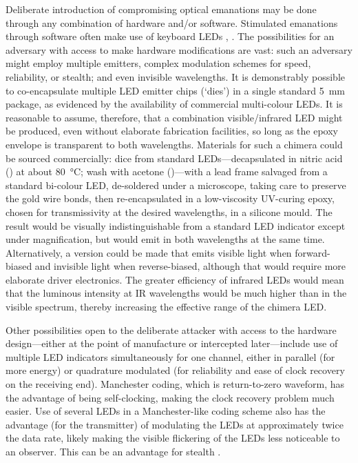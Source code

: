 \documentclass[a4paper,twoside,11pt,openany]{book}
\begin{document}
Deliberate introduction of compromising optical emanations may be done through
any combination of hardware and/or software. Stimulated emanations through
software often make use of keyboard LEDs \cite[Appendix A]{Loughry2002a},
\cite{Zhou2018c}. The possibilities for an adversary
with access to make hardware modifications are vast: such an adversary might
employ multiple emitters, complex modulation schemes for speed, reliability, or
stealth; and even invisible wavelengths. It is demonstrably possible to
co-encapsulate multiple LED emitter chips (`dies') in a single standard
\SI{5}{\milli\metre} package, as evidenced by the availability of commercial
multi-colour LEDs. It is reasonable to assume, therefore, that a combination
visible/infrared LED might be produced, even without elaborate fabrication
facilities, so long as the epoxy envelope is transparent to both wavelengths.
Materials for such a chimera could be sourced commercially: dice from standard
LEDs---decapsulated in nitric acid () at about \SI{80}{\celsius}; wash
with acetone ()---with a lead frame salvaged from a standard
bi-colour LED,
de-soldered under a microscope, taking care to preserve the gold wire bonds,
then re-encapsulated in a low-viscosity UV-curing epoxy, chosen for
transmissivity at the desired wavelengths, in a silicone mould. The result
would be visually indistinguishable from a standard LED indicator except under
magnification, but would emit in both wavelengths at the same time.
Alternatively, a version could be made that emits visible light when
forward-biased and invisible light when reverse-biased, although that would
require more elaborate driver electronics. The greater efficiency of infrared
LEDs would mean that the luminous intensity at IR wavelengths would be much
higher than in the visible spectrum, thereby increasing the effective range of
the chimera LED.

Other possibilities open to the deliberate attacker with access to the hardware
design---either at the point of manufacture or intercepted later---include use
of multiple LED indicators simultaneously for one channel, either in parallel
(for more energy) or quadrature modulated (for reliability and ease of clock
recovery on the receiving end). Manchester coding, which is return-to-zero
waveform, has the advantage of being self-clocking, making the clock recovery
problem much easier. Use of several LEDs in a Manchester-like coding scheme
also has the advantage (for the transmitter) of modulating the LEDs at
approximately twice the data rate, likely making the visible flickering of the
LEDs less noticeable to an observer. This can be an advantage for stealth
\cite{Zhou2018c}.
\end{document}
